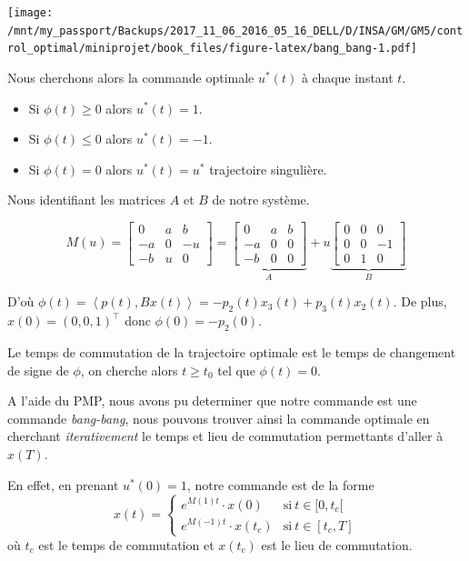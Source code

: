 \documentclass[
  french,
]{article}
\providecommand{\tightlist}{%
  \setlength{\itemsep}{0pt}\setlength{\parskip}{0pt}}
\begin{document}
\texttt{[image: /mnt/my\_passport/Backups/2017\_11\_06\_2016\_05\_16\_DELL/D/INSA/GM/GM5/control\_optimal/miniprojet/book\_files/figure-latex/bang\_bang-1.pdf]}

Nous cherchons alors la commande optimale \(u^*(t)\)
à chaque instant \(t\).

\begin{itemize}
\tightlist
\item
  Si \(\phi(t)\geq 0\) alors \(u^*(t) = 1\).
\item
  Si \(\phi(t)\leq 0\) alors \(u^*(t) = -1\).
\item
  Si \(\phi(t) = 0\) alors \(u^*(t) = u^*\) trajectoire singulière.
\end{itemize}

Nous identifiant les matrices \(A\) et \(B\) de notre système.

\[ M(u) = \left[\begin{matrix}0 & a & b\\- a & 0 & - u\\- b & u & 0\end{matrix}\right]
    = \underbrace{\left[\begin{matrix}0 & a & b\\- a & 0 & 0\\- b & 0 & 0\end{matrix}\right]}_{A} +u \underbrace{\left[\begin{matrix}0 & 0 & 0\\0 & 0 & -1\\0 & 1 & 0\end{matrix}\right]}_{B}\]

D'où \(\phi(t) = \left\langle p(t){,}Bx(t)\right\rangle = -p_2(t)x_3(t) +p_3(t)x_2(t)\).
De plus, \(x(0)={(0,0,1)}^{\top}\) donc \(\phi(0) = -p_2(0)\).

Le temps de commutation de la trajectoire optimale
est le temps de changement de signe de \(\phi\),
on cherche alors \(t\geq t_0\) tel que \(\phi(t) = 0\).

A l'aide du PMP, nous avons pu determiner que notre commande
est une commande \emph{bang-bang}, nous pouvons trouver ainsi
la commande optimale en cherchant \emph{iterativement}
le temps et lieu de commutation permettants d'aller à \(x(T)\).

En effet, en prenant \(u^*(0)=1\), notre commande est de la forme
\[x(t)=\begin{cases}
    e^{M(1)t}\cdot x(0) &\text{si}~t\in[0,t_c[\\
    e^{M(-1)t}\cdot x(t_c) &\text{si}~t\in[t_c,T]
\end{cases}\]
où \(t_c\) est le temps de commutation et \(x(t_c)\) est le lieu de commutation.
\end{document}
